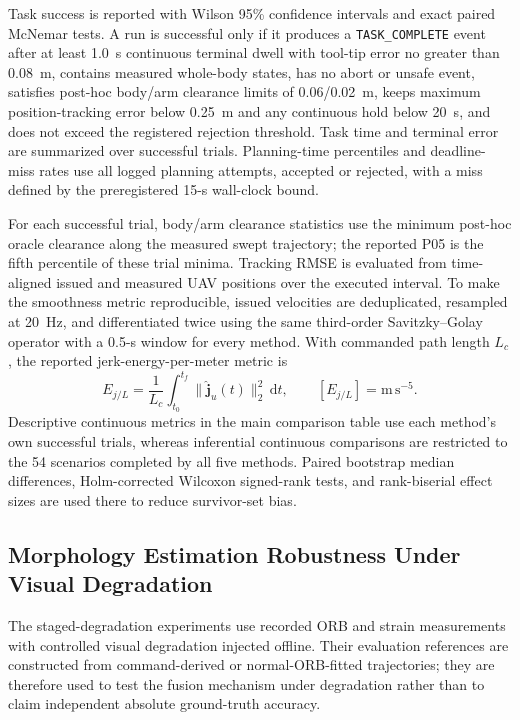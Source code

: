 \documentclass[journal,twoside]{IEEEtran}
\begin{document}
Task success is reported with Wilson 95\% confidence intervals and exact paired McNemar tests. A run is successful only if it produces a \texttt{TASK\_COMPLETE} event after at least 1.0~s continuous terminal dwell with tool-tip error no greater than 0.08~m, contains measured whole-body states, has no abort or unsafe event, satisfies post-hoc body/arm clearance limits of 0.06/0.02~m, keeps maximum position-tracking error below 0.25~m and any continuous hold below 20~s, and does not exceed the registered rejection threshold. Task time and terminal error are summarized over successful trials. Planning-time percentiles and deadline-miss rates use all logged planning attempts, accepted or rejected, with a miss defined by the preregistered 15-s wall-clock bound.

For each successful trial, body/arm clearance statistics use the minimum post-hoc oracle clearance along the measured swept trajectory; the reported P05 is the fifth percentile of these trial minima. Tracking RMSE is evaluated from time-aligned issued and measured UAV positions over the executed interval. To make the smoothness metric reproducible, issued velocities are deduplicated, resampled at 20~Hz, and differentiated twice using the same third-order Savitzky--Golay operator with a 0.5-s window for every method. With commanded path length $L_c$, the reported jerk-energy-per-meter metric is
\begin{equation}
E_{j/L}=\frac{1}{L_c}\int_{t_0}^{t_f}
\|\hat{\mathbf j}_u(t)\|_2^2\,\mathrm dt,
\qquad [E_{j/L}]=\mathrm{m\,s^{-5}}.
\label{eq:jerk_metric}
\end{equation}
Descriptive continuous metrics in the main comparison table use each method's own successful trials, whereas inferential continuous comparisons are restricted to the 54 scenarios completed by all five methods. Paired bootstrap median differences, Holm-corrected Wilcoxon signed-rank tests, and rank-biserial effect sizes are used there to reduce survivor-set bias.

\subsection{Morphology Estimation Robustness Under Visual Degradation}
The staged-degradation experiments use recorded ORB and strain measurements with controlled visual degradation injected offline. Their evaluation references are constructed from command-derived or normal-ORB-fitted trajectories; they are therefore used to test the fusion mechanism under degradation rather than to claim independent absolute ground-truth accuracy.
\end{document}
